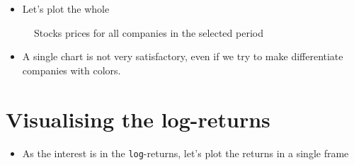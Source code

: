 \documentclass[
  12pt]{article}
\providecommand{\tightlist}{%
  \setlength{\itemsep}{0pt}\setlength{\parskip}{0pt}}\usepackage{longtable,booktabs,array}
\theoremstyle{definition}
\theoremstyle{remark}
\begin{document}
\begin{itemize}
\tightlist
\item
  Let's plot the whole
\end{itemize}

\begin{figure}


\caption{\label{fig-all-stocks}Stocks prices for all companies in the
selected period}

\end{figure}%

\begin{itemize}
\tightlist
\item
  A single chart is not very satisfactory, even if we try to make
  differentiate companies with colors.
\end{itemize}

\section{Visualising the log-returns}\label{visualising-the-log-returns}

\begin{itemize}
\tightlist
\item
  As the interest is in the \texttt{log}-returns, let's plot the returns
  in a single frame
\end{itemize}
\end{document}
